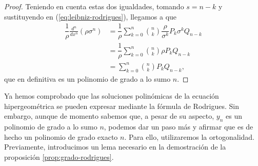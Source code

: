 \begin{proof}
    Teniendo en cuenta estas dos igualdades, tomando $s=n-k$ y sustituyendo en (\ref{eq:leibniz-rodrigues}), llegamos a que 
    \begin{equation}
        \begin{split}
            \dfrac 1 \rho \frac{d^n }{d x^n}(\rho \sigma^n) &= \dfrac 1 \rho  \sum_{k=0}^n \binom{n}{k}  \dfrac\rho{\sigma^k} P_k \sigma^{k} Q_{n-k} \\
            &= \dfrac 1 \rho \sum_{k=0}^n \binom{n}{k} \rho P_k Q_{n-k} \\
            &= \sum_{k=0}^n \binom{n}{k} P_k Q_{n-k},
        \end{split}
    \end{equation}
    que en definitiva es un polinomio de grado a lo sumo $n$.

\end{proof}

Ya hemos comprobado que las soluciones polinómicas de la ecuación hipergeométrica se pueden expresar mediante la fórmula de Rodrigues. Sin embargo, aunque de momento sabemos que, a pesar de su aspecto, $y_n$ es un polinomio de grado a lo sumo $n$, podemos dar un paso más y afirmar que es de hecho un polinomio de grado exacto $n$. Para ello, utilizaremos la ortogonalidad. Previamente, introducimos un lema necesario en la demostración de la proposición \ref{prop:grado-rodrigues}.

